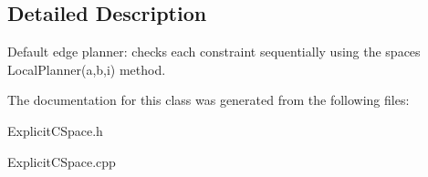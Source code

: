 \subsection{Detailed Description}
Default edge planner\+: checks each constraint sequentially using the space\textquotesingle{}s Local\+Planner(a,b,i) method. 

The documentation for this class was generated from the following files\+:\begin{DoxyCompactItemize}
\item 
Explicit\+C\+Space.\+h\item 
Explicit\+C\+Space.\+cpp\end{DoxyCompactItemize}
